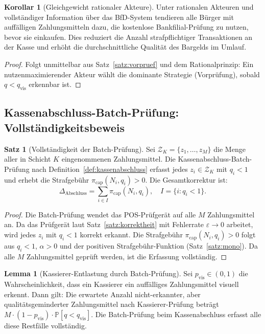﻿\documentclass[a4paper,12pt]{article}
\theoremstyle{definition}
\newtheorem{satz}{Satz}
\newtheorem{lemma}{Lemma}
\newtheorem{korollar}{Korollar}
\begin{document}
\begin{korollar}[Gleichgewicht rationaler Akteure]
\label{kor:gleichgewicht}
Unter rationalen Akteuren und vollständiger Information über das BfD-System
tendieren alle Bürger mit auffälligen Zahlungsmitteln dazu,
die kostenlose Bankfilial-Prüfung zu nutzen, bevor sie einkaufen.
Dies reduziert die Anzahl strafpflichtiger Transaktionen an der Kasse
und erhöht die durchschnittliche Qualität des Bargelds im Umlauf.
\end{korollar}

\begin{proof}
Folgt unmittelbar aus Satz~\ref{satz:vorpruef} und dem Rationalprinzip:
Ein nutzenmaximierender Akteur wählt die dominante Strategie
(Vorprüfung), sobald $q < q_{\text{vis}}$ erkennbar ist.
\end{proof}

\subsection{Kassenabschluss-Batch-Prüfung: Vollständigkeitsbeweis}

\begin{satz}[Vollständigkeit der Batch-Prüfung]
\label{satz:batch}
Sei $\mathcal{Z}_K = \{z_1,\ldots,z_M\}$ die Menge aller in Schicht $K$
eingenommenen Zahlungsmittel.  Die Kassenabschluss-Batch-Prüfung nach
Definition~\ref{def:kassenabschluss} erfasst jedes $z_i \in \mathcal{Z}_K$
mit $q_i < 1$ und erhebt die Strafgebühr $\pi_{\text{cap}}(N_i, q_i) > 0$.
Die Gesamtkorrektur ist:
\[
\Delta_{\text{Abschluss}} = \sum_{i \in I} \pi_{\text{cap}}(N_i, q_i),
\quad I = \{i : q_i < 1\}.
\]
\end{satz}

\begin{proof}
Die Batch-Prüfung wendet das POS-Prüfgerät auf alle $M$ Zahlungsmittel an.
Da das Prüfgerät laut Satz~\ref{satz:korrektheit} mit Fehlerrate
$\varepsilon \to 0$ arbeitet, wird jedes $z_i$ mit $q_i < 1$ korrekt erkannt.
Die Strafgebühr $\pi_{\text{cap}}(N_i, q_i) > 0$ folgt aus
$q_i < 1$, $\alpha > 0$ und der positiven Strafgebühr-Funktion
(Satz~\ref{satz:mono}).  Da alle $M$ Zahlungsmittel geprüft werden,
ist die Erfassung vollständig.
\end{proof}

\begin{lemma}[Kassierer-Entlastung durch Batch-Prüfung]
\label{lem:kassierer}
Sei $p_{\text{vis}} \in (0,1)$ die Wahrscheinlichkeit, dass ein Kassierer
ein auffälliges Zahlungsmittel visuell erkennt.  Dann gilt:
Die erwartete Anzahl nicht-erkannter, aber qualitätsgeminderter Zahlungsmittel
nach Kassierer-Prüfung beträgt $M \cdot (1-p_{\text{vis}}) \cdot \mathbb{P}[q < q_{\text{vis}}]$.
Die Batch-Prüfung beim Kassenabschluss erfasst alle diese Restfälle vollständig.
\end{lemma}
\end{document}
